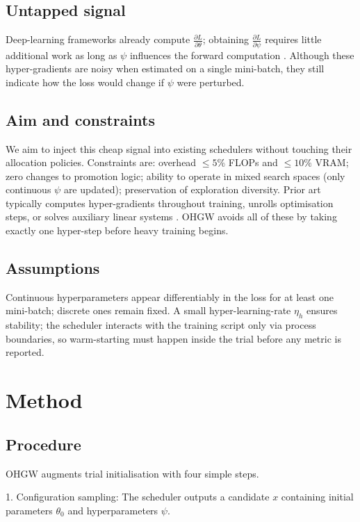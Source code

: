 \documentclass{article}
\begin{document}
\subsection{Untapped signal}
Deep-learning frameworks already compute \(\tfrac{\partial L}{\partial \theta}\); obtaining \(\tfrac{\partial L}{\partial \psi}\) requires little additional work as long as \(\psi\) influences the forward computation \cite{chandra-2019-gradient}. Although these hyper-gradients are noisy when estimated on a single mini-batch, they still indicate how the loss would change if \(\psi\) were perturbed.

\subsection{Aim and constraints}
We aim to inject this cheap signal into existing schedulers without touching their allocation policies. Constraints are: overhead \(\leq 5 \%\) FLOPs and \(\leq 10 \%\) VRAM; zero changes to promotion logic; ability to operate in mixed search spaces (only continuous \(\psi\) are updated); preservation of exploration diversity. Prior art typically computes hyper-gradients throughout training, unrolls optimisation steps, or solves auxiliary linear systems \cite{bertrand-2020-implicit,immer-2023-stochastic}. OHGW avoids all of these by taking exactly one hyper-step before heavy training begins.

\subsection{Assumptions}
Continuous hyperparameters appear differentiably in the loss for at least one mini-batch; discrete ones remain fixed. A small hyper-learning-rate \(\eta_h\) ensures stability; the scheduler interacts with the training script only via process boundaries, so warm-starting must happen inside the trial before any metric is reported.

\section{Method}
\subsection{Procedure}
OHGW augments trial initialisation with four simple steps.

1. Configuration sampling: The scheduler outputs a candidate \(x\) containing initial parameters \(\theta_0\) and hyperparameters \(\psi\).
\end{document}
